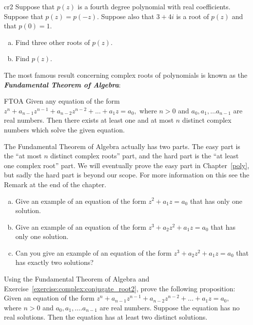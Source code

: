 \begin{exercise}{cr2}
Suppose that $p(z)$ is a fourth degree polynomial with real coefficients. Suppose that $p(z) = p(-z)$. Suppose also that $3+4i$ is a root of $p(z)$  and that $p(0) = 1$.  
\begin{enumerate}[(a)]
\item
Find three other roots of $p(z)$.
\item
Find $p(z)$. 
\end{enumerate}
\end{exercise}


The most famous result concerning complex roots of polynomials is known as the {\bf \emph{Fundamental Theorem of Algebra}}:

\begin{prop}{FTOA} Given any equation of the form $z^n + a_{n-1}z^{n-1} + a_{n-2} z^{n-2} + \ldots + a_1 z =a_0,$ where $n>0$ and $a_0, a_1, \ldots a_{n-1}$ are real numbers. Then there exists at least one and at most $n$ distinct complex numbers which solve the given equation. 
\end{prop}

The Fundamental Theorem of Algebra actually has two parts. The easy part is the ``at most $n$ distinct complex roots'' part, and the hard part is the ``at least one complex root'' part. We will eventually prove the easy part in Chapter~\ref{poly}, but sadly the hard part is beyond our scope. For more information on this see the  Remark  at the end of the chapter.

\begin{exercise}{70}
\begin{enumerate}[(a)]
\item
Give an example of an equation of the form $z^2 + a_1z = a_0$ that has only one solution.
\item
Give an example of an equation of the form $z^3 + a_2z^2 + a_1 z = a_0$ that has only one solution.
\item
Can you give an example of an equation of the form $z^3 + a_2z^2 + a_1 z = a_0$ that has exactly two solutions?
\end{enumerate}
\end{exercise}


\begin{exercise}{72}
Using the Fundamental Theorem of Algebra and Exercise~\ref{exercise:complex:conjugate_root2}, prove the following proposition: 
Given an equation of the form $z^n + a_{n-1}z^{n-1} + a_{n-2} z^{n-2} + \ldots + a_1 z =a_0,$ where $n>0$ and $a_0, a_1, \ldots. a_{n-1}$ are real numbers. Suppose the equation has no real solutions. Then the equation has at least two distinct solutions.
\end{exercise}

